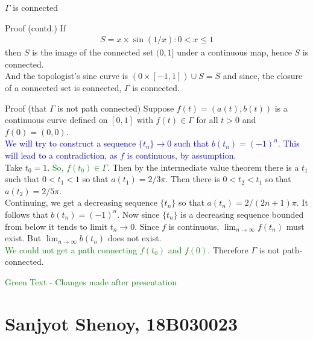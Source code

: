 \documentclass{beamer}
\begin{document}
\begin{frame}{$\Gamma$ is connected}
\begin{block}{Proof (contd.)}
If 
\begin{align*}
S={x \times \sin(1/x) : 0 < x \leq 1}
\end{align*}
then $S$ is the image of the connected set $(0,1]$ under a continuous map, hence $S$ is connected.\\ And the topologist's sine curve is $(0\times [-1,1]) \cup S = \overline{S}$ and since, the closure of a connected set is connected, $\Gamma$ is connected.
\end{block}
\end{frame}



\begin{frame}
\begin{block}{Proof (that $\Gamma$ is not path connected)}
Suppose $f(t) = (a(t), b(t))$ is a continuous curve defined on $[0, 1]$ with $f(t) \in \Gamma$ for all $t > 0$ and $f(0) = (0, 0)$.  \\
\textcolor{blue}{We will try to construct a sequence $\{t_{n}\} \to 0$ such that $b(t_{n}) = (-1)^n$. This will lead to a contradiction, as $f$ is continuous, by assumption}.\\
Take $t_{0} = 1$. \textcolor{green}{So, $f(t_{0}) \in \Gamma$}.
Then by the intermediate value theorem there is a $t_{1}$ such that $0 < t_{1} < 1$ so that $a(t_{1}) = 2/3\pi$. Then there is $0 < t_{2} < t_{1}$ so that $a(t_{2}) = 2/5\pi$. \\ Continuing, we get a decreasing sequence $\{t_{n}\}$ so that $a(t_{n}) = 2/(2n+1)\pi$. It follows that $b(t_{n}) = (-1)^n$.
Now since $\{t_{n}\}$ is a decreasing sequence bounded from below it tends to limit $t_{n} \to 0$. Since $f$ is continuous, $\lim_{n \to \infty} f(t_{n})$ must exist. But $\lim_{n\to \infty} b(t_{n})$ does not exist.\\
\textcolor{green}{We could not get a path connecting $f(t_{0})$ and $f(0)$}.
Therefore $\Gamma$ is not path-connected.
\end{block}
\tiny \textcolor{green}{Green Text - Changes made after presentation}
\end{frame}


\section{Sanjyot Shenoy, 18B030023}
\end{document}
